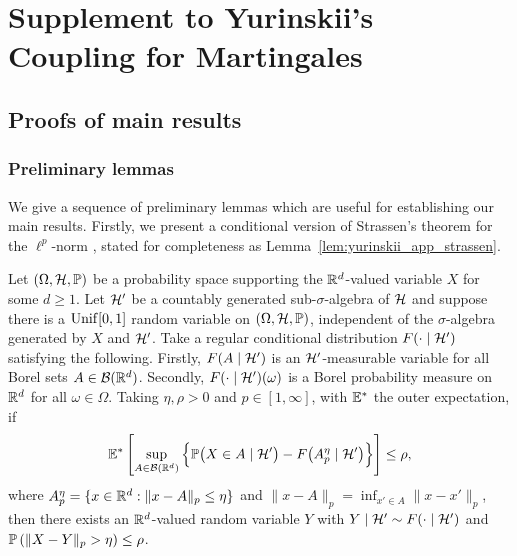 
\chapter[Supplement to Yurinskii's Coupling for Martingales]%
{Supplement to Yurinskii's \\ Coupling for Martingales}
\label{app:yurinskii}

\section{Proofs of main results}
\label{sec:yurinskii_app_proofs}

\subsection{Preliminary lemmas}

We give a sequence of preliminary lemmas which are useful for establishing our
main results. Firstly, we present a conditional version of Strassen's theorem
for the $\ell^p$-norm \citep[Theorem~B.2]{chen2020jackknife}, stated for
completeness as Lemma~\ref{lem:yurinskii_app_strassen}.

\begin{lemma}%
  \label{lem:yurinskii_app_strassen}
  Let $(\Omega, \cH, \P)$ be a probability space supporting the $\R^d$-valued
  variable $X$ for some $d \geq 1$. Let $\cH'$ be a countably generated
  sub-$\sigma$-algebra of $\cH$ and suppose there is a $\Unif[0,1]$ random
  variable on $(\Omega, \cH, \P)$, independent of the $\sigma$-algebra
  generated by $X$ and $\cH'$. Take a regular conditional distribution
  $F(\cdot \mid \cH')$ satisfying the following. Firstly, $F(A \mid \cH')$ is
  an $\cH'$-measurable variable for all Borel sets $A \in \cB(\R^d)$.
  Secondly, $F(\cdot \mid \cH')(\omega)$ is a Borel probability measure on
  $\R^d$ for all $\omega \in \Omega$. Taking $\eta, \rho > 0$ and
  $p \in [1, \infty]$, with $\E^*$ the outer expectation, if
  \begin{align*}
    \E^* \left[
      \sup_{A \in \cB(\R^d)}
      \Big\{
        \P \big( X \in A \mid \cH' \big)
        - F \big( A_p^\eta \mid \cH' \big)
      \Big\}
    \right]
    \leq \rho,
  \end{align*}
  where $A_p^\eta = \{x \in \R^d : \|x - A\|_p \leq \eta\}$
  and $\|x - A\|_p = \inf_{x' \in A} \|x - x'\|_p$,
  then there exists an $\R^d$-valued random variable $Y$
  with $Y \mid \cH' \sim F(\cdot \mid \cH')$
  and $\P \left( \|X-Y\|_p > \eta \right) \leq \rho$.
\end{lemma}

